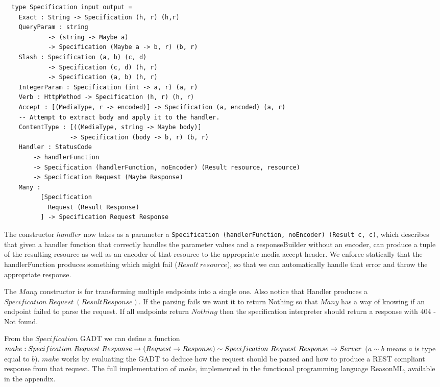 \begin{lstlisting}
  type Specification input output =
    Exact : String -> Specification (h, r) (h,r)
    QueryParam : string 
            -> (string -> Maybe a) 
            -> Specification (Maybe a -> b, r) (b, r)
    Slash : Specification (a, b) (c, d) 
            -> Specification (c, d) (h, r) 
            -> Specification (a, b) (h, r) 
    IntegerParam : Specification (int -> a, r) (a, r)
    Verb : HttpMethod -> Specification (h, r) (h, r)
    Accept : [(MediaType, r -> encoded)] -> Specification (a, encoded) (a, r)
    -- Attempt to extract body and apply it to the handler.
    ContentType : [((MediaType, string -> Maybe body)]
                  -> Specification (body -> b, r) (b, r)
    Handler : StatusCode 
        -> handlerFunction 
        -> Specification (handlerFunction, noEncoder) (Result resource, resource)
        -> Specification Request (Maybe Response)
    Many :
          [Specification 
            Request (Result Response)
          ] -> Specification Request Response
\end{lstlisting}

The constructor $handler$ now takes as a parameter a \texttt{Specification
(handlerFunction, noEncoder) (Result c, c)}, which describes that given a
handler function that correctly handles the parameter values and a
responseBuilder without an encoder, can produce a tuple of the resulting
resource as well as an encoder of that resource to the appropriate media accept
header. We enforce statically that the handlerFunction produces something which
might fail ($Result\ resource$), so that we can automatically handle that error
and throw the appropriate response. 

The $Many$ constructor is for transforming multiple endpoints into a single one.
Also notice that Handler produces a $Specification\ Request\ (Result Response)$.
If the parsing fails we want it to return Nothing so that $Many$ has a way of
knowing if an endpoint failed to parse the request. If all endpoints return
$Nothing$ then the specification interpreter should return a response with  404
- Not found.

From the $Specification$ GADT we can define a function\\ $make : Specification\
Request\ Response \rightarrow (Request \rightarrow Response) \sim\\
Specification\ Request\ Response \rightarrow Server$ ($a\sim b$ means $a$ is
type equal to $b$).  $make$ works by evaluating the GADT to deduce how the
request should be parsed and how to produce a REST compliant response from that
request.  The full implementation of $make$, implemented in the functional
programming language ReasonML, available in the appendix.

